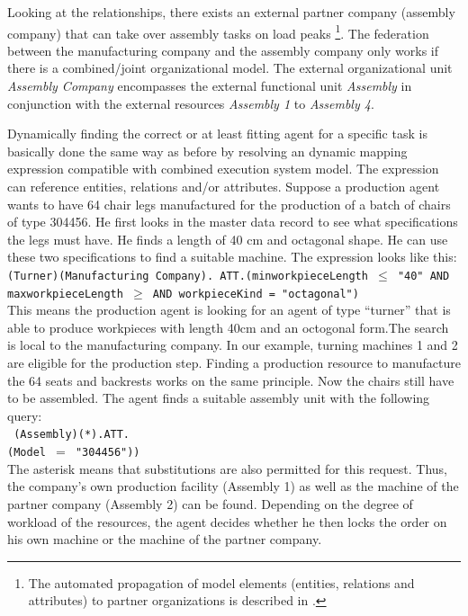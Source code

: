 Looking at the relationships, there exists an external partner company (assembly company) that can take over assembly tasks on load peaks
\footnote{The automated propagation of model elements (entities, relations and attributes) to partner organizations is described in \cite{Lawall2014a}.}. The federation between the manufacturing company and the assembly company only works if there is a combined/joint organizational model. The external organizational unit \emph{Assembly Company} encompasses the external functional unit \emph{Assembly} in conjunction with the external resources \emph{Assembly 1} to \emph{Assembly 4}. 


Dynamically finding the correct or at least fitting agent for a specific task is basically done the same way as before by resolving an dynamic mapping expression compatible with combined execution system model. The expression can reference entities, relations and/or attributes. Suppose a production agent wants to have 64 chair legs manufactured for the production of a batch of chairs of type 304456. He first looks in the master data record to see what specifications the legs must have. He finds a length of 40 cm and octagonal shape. He can use these two specifications to find a suitable machine. The expression looks like this:\\

\texttt{(Turner)(Manufacturing Company). ATT.(minworkpieceLength $\leq$ "40" AND maxworkpieceLength $\geq$ AND workpieceKind = "octagonal")}\\

This means the production agent is looking for an agent of type "`turner"' that is able to produce workpieces with length 40cm and an octogonal form.The search is local to the manufacturing company. In our example, turning machines 1 and 2 are eligible for the production step. Finding a production resource to manufacture the 64 seats and backrests works on the same principle. Now the chairs still have to be assembled. The agent finds a suitable assembly unit with the following query:\\

\texttt{ (Assembly)(*).ATT.\\(Model $=$ "304456"))} \\
 
The asterisk means that substitutions are also permitted for this request. Thus, the company's own production facility (Assembly 1) as well as the machine of the partner company (Assembly 2) can be found. Depending on the degree of workload of the resources, the agent decides whether he then locks the order on his own machine or the machine of the partner company. \\

